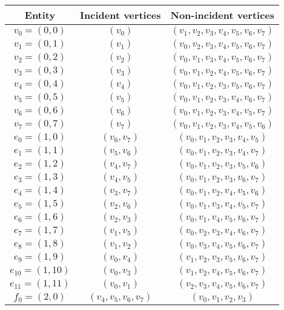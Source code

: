 \begin{center}
  \begin{tabular}{ccc}
    \toprule
    Entity & Incident vertices & Non-incident vertices \\
    \hline
    $v_0 = (0, 0)$ & $(v_0)$ & $(v_1, v_2, v_3, v_4, v_5, v_6, v_7)$ \\
    $v_1 = (0, 1)$ & $(v_1)$ & $(v_0, v_2, v_3, v_4, v_5, v_6, v_7)$ \\
    $v_2 = (0, 2)$ & $(v_2)$ & $(v_0, v_1, v_3, v_4, v_5, v_6, v_7)$ \\
    $v_3 = (0, 3)$ & $(v_3)$ & $(v_0, v_1, v_2, v_4, v_5, v_6, v_7)$ \\
    $v_4 = (0, 4)$ & $(v_4)$ & $(v_0, v_1, v_2, v_3, v_5, v_6, v_7)$ \\
    $v_5 = (0, 5)$ & $(v_5)$ & $(v_0, v_1, v_2, v_3, v_4, v_6, v_7)$ \\
    $v_6 = (0, 6)$ & $(v_6)$ & $(v_0, v_1, v_2, v_3, v_4, v_5, v_7)$ \\
    $v_7 = (0, 7)$ & $(v_7)$ & $(v_0, v_1, v_2, v_3, v_4, v_5, v_6)$ \\
    $e_0 = (1, 0)$ & $(v_6, v_7)$ & $(v_0, v_1, v_2, v_3, v_4, v_5)$ \\
    $e_1 = (1, 1)$ & $(v_5, v_6)$ & $(v_0, v_1, v_2, v_3, v_4, v_7)$ \\
    $e_2 = (1, 2)$ & $(v_4, v_7)$ & $(v_0, v_1, v_2, v_3, v_5, v_6)$ \\
    $e_3 = (1, 3)$ & $(v_4, v_5)$ & $(v_0, v_1, v_2, v_3, v_6, v_7)$ \\
    $e_4 = (1, 4)$ & $(v_3, v_7)$ & $(v_0, v_1, v_2, v_4, v_5, v_6)$ \\
    $e_5 = (1, 5)$ & $(v_2, v_6)$ & $(v_0, v_1, v_3, v_4, v_5, v_7)$ \\
    $e_6 = (1, 6)$ & $(v_2, v_3)$ & $(v_0, v_1, v_4, v_5, v_6, v_7)$ \\
    $e_7 = (1, 7)$ & $(v_1, v_5)$ & $(v_0, v_2, v_3, v_4, v_6, v_7)$ \\
    $e_8 = (1, 8)$ & $(v_1, v_2)$ & $(v_0, v_3, v_4, v_5, v_6, v_7)$ \\
    $e_9 = (1, 9)$ & $(v_0, v_4)$ & $(v_1, v_2, v_3, v_5, v_6, v_7)$ \\
    $e_{10} = (1, 10)$ & $(v_0, v_3)$ & $(v_1, v_2, v_4, v_5, v_6, v_7)$ \\
    $e_{11} = (1, 11)$ & $(v_0, v_1)$ & $(v_2, v_3, v_4, v_5, v_6, v_7)$ \\
    $f_0 = (2, 0)$ & $(v_4, v_5, v_6, v_7)$ & $(v_0, v_1, v_2, v_3)$ \\

\end{tabular}
\end{center}
